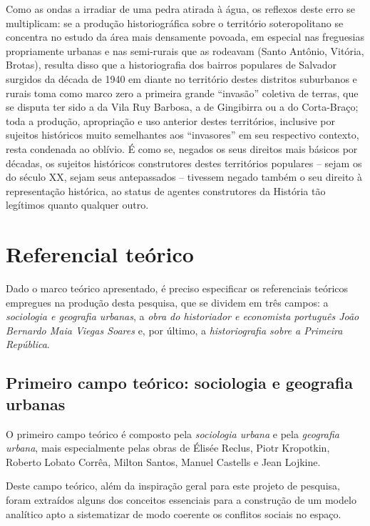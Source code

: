 Como as ondas a irradiar de uma pedra atirada à água, os reflexos deste erro se multiplicam: se a produção historiográfica sobre o território soteropolitano se concentra no estudo da área mais densamente povoada, em especial nas freguesias propriamente urbanas e nas semi-rurais que as rodeavam (Santo Antônio, Vitória, Brotas), resulta disso que a historiografia dos bairros populares de Salvador surgidos da década de 1940 em diante no território destes distritos suburbanos e rurais toma como marco zero a primeira grande ``invasão'' coletiva de terras, que se disputa ter sido a da Vila Ruy Barbosa, a de Gingibirra ou a do Corta-Braço; toda a produção, apropriação e uso anterior destes territórios, inclusive por sujeitos históricos muito semelhantes aos ``invasores'' em seu respectivo contexto, resta condenada ao oblívio. É como se, negados os seus direitos mais básicos por décadas, os sujeitos históricos construtores destes territórios populares -- sejam os do século XX, sejam seus antepassados --  tivessem negado também o seu direito à representação histórica, ao status de agentes construtores da História tão legítimos quanto qualquer outro.

\section{Referencial teórico}
\label{sec:refeteor}

Dado o marco teórico apresentado, é preciso especificar os referenciais teóricos empregues na produção desta pesquisa, que se dividem em três campos: a \textit{sociologia e geografia urbanas}, a \textit{obra do historiador e economista português João Bernardo Maia Viegas Soares} e, por último, a \textit{historiografia sobre a Primeira República}.

\subsection{Primeiro campo teórico: sociologia e geografia urbanas}
\label{subsec:sociogeogrurb}

O primeiro campo teórico é composto pela \textit{sociologia urbana} e pela \textit{geografia urbana}, mais especialmente pelas obras de Élisée Reclus, Piotr Kropotkin, Roberto Lobato Corrêa, Milton Santos, Manuel Castells e Jean Lojkine.

Deste campo teórico, além da inspiração geral para este projeto de pesquisa, foram extraídos alguns dos conceitos essenciais para a construção de um modelo analítico apto a sistematizar de modo coerente os conflitos sociais no espaço.

